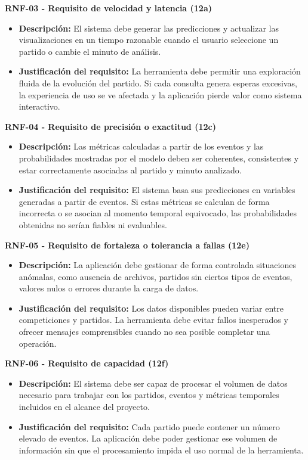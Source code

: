 \textbf{RNF-03 - Requisito de velocidad y latencia (12a)}

\begin{itemize}
    \item \textbf{Descripción:} El sistema debe generar las predicciones y actualizar las visualizaciones en un tiempo razonable cuando el usuario seleccione un partido o cambie el minuto de análisis.
    \item \textbf{Justificación del requisito:} La herramienta debe permitir una exploración fluida de la evolución del partido. Si cada consulta genera esperas excesivas, la experiencia de uso se ve afectada y la aplicación pierde valor como sistema interactivo.
\end{itemize}

\textbf{RNF-04 - Requisito de precisión o exactitud (12c)}

\begin{itemize}
    \item \textbf{Descripción:} Las métricas calculadas a partir de los eventos y las probabilidades mostradas por el modelo deben ser coherentes, consistentes y estar correctamente asociadas al partido y minuto analizado.
    \item \textbf{Justificación del requisito:} El sistema basa sus predicciones en variables generadas a partir de eventos. Si estas métricas se calculan de forma incorrecta o se asocian al momento temporal equivocado, las probabilidades obtenidas no serían fiables ni evaluables.
\end{itemize}

\textbf{RNF-05 - Requisito de fortaleza o tolerancia a fallas (12e)}

\begin{itemize}
    \item \textbf{Descripción:} La aplicación debe gestionar de forma controlada situaciones anómalas, como ausencia de archivos, partidos sin ciertos tipos de eventos, valores nulos o errores durante la carga de datos.
    \item \textbf{Justificación del requisito:} Los datos disponibles pueden variar entre competiciones y partidos. La herramienta debe evitar fallos inesperados y ofrecer mensajes comprensibles cuando no sea posible completar una operación.
\end{itemize}

\textbf{RNF-06 - Requisito de capacidad (12f)}

\begin{itemize}
    \item \textbf{Descripción:} El sistema debe ser capaz de procesar el volumen de datos necesario para trabajar con los partidos, eventos y métricas temporales incluidos en el alcance del proyecto.
    \item \textbf{Justificación del requisito:} Cada partido puede contener un número elevado de eventos. La aplicación debe poder gestionar ese volumen de información sin que el procesamiento impida el uso normal de la herramienta.
\end{itemize}

